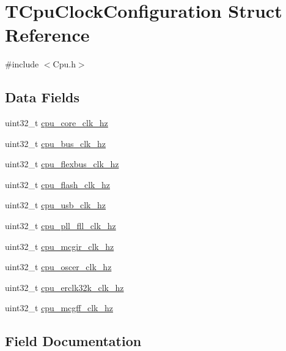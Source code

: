 \hypertarget{struct_t_cpu_clock_configuration}{}\section{T\+Cpu\+Clock\+Configuration Struct Reference}
\label{struct_t_cpu_clock_configuration}


{\ttfamily \#include $<$Cpu.\+h$>$}

\subsection*{Data Fields}
\begin{DoxyCompactItemize}
\item 
uint32\+\_\+t \hyperlink{struct_t_cpu_clock_configuration_a231396cab845ceee51d385f301e10ae9}{cpu\+\_\+core\+\_\+clk\+\_\+hz}
\item 
uint32\+\_\+t \hyperlink{struct_t_cpu_clock_configuration_a723303787ace5402914fb408ccfb6291}{cpu\+\_\+bus\+\_\+clk\+\_\+hz}
\item 
uint32\+\_\+t \hyperlink{struct_t_cpu_clock_configuration_a4153417da07b1a0badbdf9d7491339fb}{cpu\+\_\+flexbus\+\_\+clk\+\_\+hz}
\item 
uint32\+\_\+t \hyperlink{struct_t_cpu_clock_configuration_a86c15101668577513b65ffa407689457}{cpu\+\_\+flash\+\_\+clk\+\_\+hz}
\item 
uint32\+\_\+t \hyperlink{struct_t_cpu_clock_configuration_a1ef0e8469806bbace76e285c88120072}{cpu\+\_\+usb\+\_\+clk\+\_\+hz}
\item 
uint32\+\_\+t \hyperlink{struct_t_cpu_clock_configuration_abb3e858dcc5909a200e98e475e2f6e22}{cpu\+\_\+pll\+\_\+fll\+\_\+clk\+\_\+hz}
\item 
uint32\+\_\+t \hyperlink{struct_t_cpu_clock_configuration_ad0cdfcdf0841049a0353182499ae2405}{cpu\+\_\+mcgir\+\_\+clk\+\_\+hz}
\item 
uint32\+\_\+t \hyperlink{struct_t_cpu_clock_configuration_ab6479052ecb6d5d50d4f67974b562bbe}{cpu\+\_\+oscer\+\_\+clk\+\_\+hz}
\item 
uint32\+\_\+t \hyperlink{struct_t_cpu_clock_configuration_a31b6d5e9d931978fc0904145f403e433}{cpu\+\_\+erclk32k\+\_\+clk\+\_\+hz}
\item 
uint32\+\_\+t \hyperlink{struct_t_cpu_clock_configuration_a59fe94a2dcdfe0b557778f58aa7bb477}{cpu\+\_\+mcgff\+\_\+clk\+\_\+hz}
\end{DoxyCompactItemize}


\subsection{Field Documentation}
\mbox{\label{struct_t_cpu_clock_configuration_a723303787ace5402914fb408ccfb6291}} 
